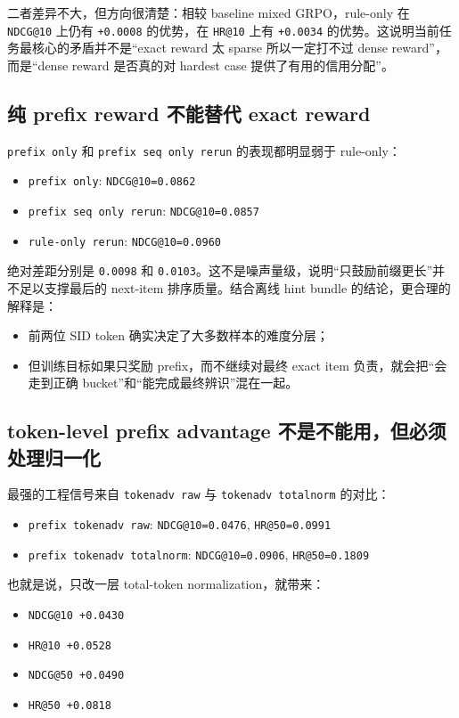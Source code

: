 \documentclass[a4paper]{article}
\begin{document}
二者差异不大，但方向很清楚：相较 baseline mixed GRPO，rule-only 在 \texttt{NDCG@10} 上仍有 \texttt{+0.0008} 的优势，在 \texttt{HR@10} 上有 \texttt{+0.0034} 的优势。这说明当前任务最核心的矛盾并不是“exact reward 太 sparse 所以一定打不过 dense reward”，而是“dense reward 是否真的对 hardest case 提供了有用的信用分配”。

\subsection{纯 prefix reward 不能替代 exact reward}

\texttt{prefix only} 和 \texttt{prefix seq only rerun} 的表现都明显弱于 rule-only：
\begin{itemize}
\item \texttt{prefix only}: \texttt{NDCG@10=0.0862}
\item \texttt{prefix seq only rerun}: \texttt{NDCG@10=0.0857}
\item \texttt{rule-only rerun}: \texttt{NDCG@10=0.0960}
\end{itemize}

绝对差距分别是 \texttt{0.0098} 和 \texttt{0.0103}。这不是噪声量级，说明“只鼓励前缀更长”并不足以支撑最后的 next-item 排序质量。结合离线 hint bundle 的结论，更合理的解释是：
\begin{itemize}
\item 前两位 SID token 确实决定了大多数样本的难度分层；
\item 但训练目标如果只奖励 prefix，而不继续对最终 exact item 负责，就会把“会走到正确 bucket”和“能完成最终辨识”混在一起。
\end{itemize}

\subsection{token-level prefix advantage 不是不能用，但必须处理归一化}

最强的工程信号来自 \texttt{tokenadv raw} 与 \texttt{tokenadv totalnorm} 的对比：
\begin{itemize}
\item \texttt{prefix tokenadv raw}: \texttt{NDCG@10=0.0476}, \texttt{HR@50=0.0991}
\item \texttt{prefix tokenadv totalnorm}: \texttt{NDCG@10=0.0906}, \texttt{HR@50=0.1809}
\end{itemize}

也就是说，只改一层 total-token normalization，就带来：
\begin{itemize}
\item \texttt{NDCG@10 +0.0430}
\item \texttt{HR@10 +0.0528}
\item \texttt{NDCG@50 +0.0490}
\item \texttt{HR@50 +0.0818}
\end{itemize}
\end{document}
